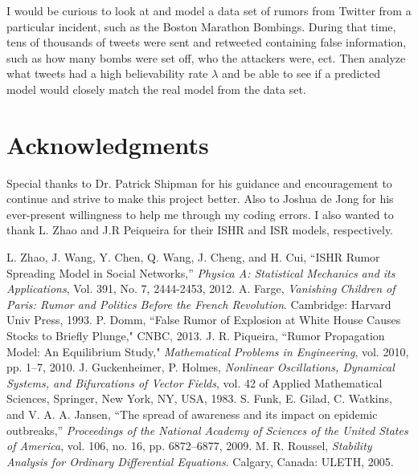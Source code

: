 \documentclass[11pt]{article}
\begin{document}
I would be curious to look at and model a data set of rumors from Twitter from a particular incident, such as the Boston Marathon Bombings. During that time, tens of thousands of tweets were sent and retweeted containing false information, such as how many bombs were set off, who the attackers were, ect. Then analyze what tweets had a high believability rate $\lambda$ and be able to see if a predicted model would closely match the real model from the data set. 




\section{Acknowledgments}
Special thanks to Dr. Patrick Shipman for his guidance and encouragement to continue and strive to make this project better. Also to Joshua de Jong for his ever-present willingness to help me through my coding errors. I also wanted to thank L. Zhao and J.R Peiqueira for their ISHR and ISR models, respectively. 

\begin{thebibliography}{99}
 L. Zhao, J. Wang, Y. Chen, Q. Wang, J. Cheng, and H. Cui, ``ISHR Rumor Spreading Model in Social Networks,” \textit{Physica A: Statistical Mechanics and its Applications}, Vol. 391, No. 7, 2444-2453, 2012.
 A. Farge, \textit{Vanishing Children of Paris: Rumor and Politics Before the French Revolution}. Cambridge: Harvard Univ Press, 1993.
 P. Domm, ``False Rumor of Explosion at White House Causes Stocks to Briefly Plunge," CNBC, 2013. 
 J. R. Piqueira, ``Rumor Propagation Model: An Equilibrium Study," \textit{Mathematical Problems in Engineering}, vol. 2010, pp. 1–7, 2010.
  J. Guckenheimer, P. Holmes, \textit{Nonlinear Oscillations, Dynamical Systems, and Bifurcations of Vector
Fields}, vol. 42 of Applied Mathematical Sciences, Springer, New York, NY, USA, 1983.
 S. Funk, E. Gilad, C. Watkins, and V. A. A. Jansen, ``The spread of awareness and its impact on
epidemic outbreaks,” \textit{Proceedings of the National Academy of Sciences of the United States of America},
vol. 106, no. 16, pp. 6872–6877, 2009.
 M. R. Roussel, \textit{Stability Analysis for Ordinary Differential Equations}. Calgary, Canada: ULETH, 2005.

\end{thebibliography}
\end{document}
